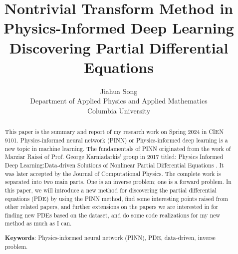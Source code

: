 \documentclass[12pt]{article}
\title{Nontrivial Transform Method in Physics-Informed Deep Learning Discovering Partial Differential Equations}
\author{Jiahua Song\\
  Department of Applied Physics and Applied Mathematics\\
  Columbia University
}
\begin{document}
\maketitle

\begin{abstract}
This paper is the summary and report of my research work on Spring 2024 in CIEN 9101. Physics-informed neural network (PINN) or Physics-informed deep learning is a new topic in machine learning. The fundamentals of PINN originated from the work of Marziar Raissi of Prof. George Karniadarkis' group in 2017 titled: Physics Informed Deep Learning:Data-driven Solutions of Nonlinear Partial Differential Equations \citep{RAISSI2019686}. It was later accepted by the Journal of Computational Physics. The complete work is separated into two main parts. One is an inverse problem; one is a forward problem. In this paper, we will introduce a new method for discovering the partial differential equations (PDE) by using the PINN method, find some interesting points raised from other related papers, and further extensions on the papers we are interested in for finding new PDEs based on the dataset, and do some code realizations for my new method as much as I can.  

\noindent\textbf{Keywords}: Physics-informed neural network (PINN), PDE, data-driven, inverse problem.
\end{abstract}
\end{document}
